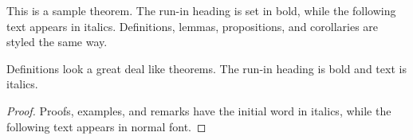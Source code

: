 \begin{theorem}[Theorem]
    This is a sample theorem. The run-in heading is set in bold, while
    the following text appears in italics. Definitions, lemmas,
    propositions, and corollaries are styled the same way.
\end{theorem}
\begin{definition}[Definition]
    Definitions look a great deal like theorems.  The run-in heading is
    bold and text is italics.\cite{Rowe:2021:OnOrdering}
\end{definition}

\begin{proof}
Proofs, examples, and remarks have the initial word in italics,
while the following text appears in normal font.
\end{proof}